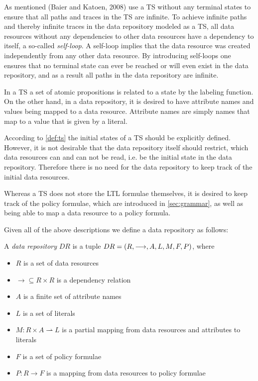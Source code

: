As mentioned (Baier and Katoen, 2008)\cite{baier2008principles} use a TS without any terminal states to ensure that all paths and traces in the TS are infinite. To achieve infinite paths and thereby infinite traces in the data repository modeled as a TS, all data resources without any dependencies to other data resources have a dependency to itself, a so-called \emph{self-loop}. A self-loop implies that the data resource was created independently from any other data resource. By introducing self-loops one ensures that no terminal state can ever be reached or will even exist in the data repository, and as a result all paths in the data repository are infinite.

In a TS a set of atomic propositions is related to a state by the labeling function. On the other hand, in a data repository, it is desired to have attribute names and values being mapped to a data resource. Attribute names are simply names that map to a value that is given by a literal.

According to \autoref{def:ts} the initial states of a TS should be explicitly defined. However, it is not desirable that the data repository itself should restrict, which data resources can and can not be read, i.e. be the initial state in the data repository. Therefore there is no need for the data repository to keep track of the initial data resources.

Whereas a TS does not store the LTL formulae themselves, it is desired to keep track of the policy formulae, which are introduced in \autoref{sec:grammar}, as well as being able to map a data resource to a policy formula.

Given all of the above descriptions we define a data repository as follows:
\begin{definition}
A \emph{data repository} $DR$ is a tuple $DR= \left( R, \longrightarrow, A, L, M, F, P \right)$, where
\begin{itemize}
  \item $R$ is a set of data resources
  \item $\longrightarrow \subseteq R \times R$ is a dependency relation
  \item $A$ is a finite set of attribute names
  \item $L$ is a set of literals
  \item $M : R \times A \rightharpoonup L$ is a partial mapping from data resources and attributes to literals
  \item $F$ is a set of policy formulae
  \item $P : R \rightarrow F$ is a mapping from data resources to policy formulae
\end{itemize}
\end{definition}

